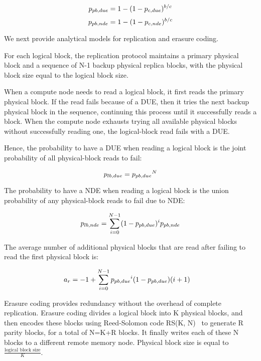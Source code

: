 \[
{p_{pb,due}}= 1 - (1-{p_{c,due}})^{b/c}
\]
\[
{p_{pb,nde}}= 1 - (1-{p_{c,nde}})^{b/c}
\]

We next provide analytical models for replication and erasure coding.

For each logical block, the replication protocol maintains a primary physical block and a sequence of N-1 backup physical replica blocks, with the physical block size equal to the logical block size. 

When a compute node needs to read a logical block, it first reads the primary physical block. If the read fails because of a DUE, then it tries the next backup physical block in the sequence, continuing this
process until it successfully reads a block. 
When the compute node exhausts trying all available physical blocks without successfully reading one, the logical-block read fails with a DUE.

Hence, the probability to have a DUE when reading a logical block is the joint probability of all physical-block reads to fail:

\[
{p_{lb,due}} = {p_{pb,due}}^{N}
\]

The probability to have a NDE when reading a logical block is the union probability of any physical-block reads to fail due to NDE:

\[
{p_{lb,nde}} = \sum_{i=0}^{N-1} (1-{p_{pb,due}})^i {p_{pb,nde}}
\]

The average number of additional physical blocks that are read after failing to read the first physical block is:

\[
\begin{split}
a_r&= -1 + \sum_{i=0}^{N-1} {p_{pb,due}}^i(1-{p_{pb,due}})(i+1)
\end{split}
\]


Erasure coding provides redundancy without the overhead of complete replication.
Erasure coding divides a logical block into K physical blocks,
and then encodes these blocks using Reed-Solomon code RS(K, N)~\cite{reed:code:journal-applied-math:1960} to generate R parity blocks, for a total of N=K+R blocks.
It finally writes each of these N blocks to a different remote memory node. 
Physical block size is equal to $\frac{\text{logical block size}}{K}$.

